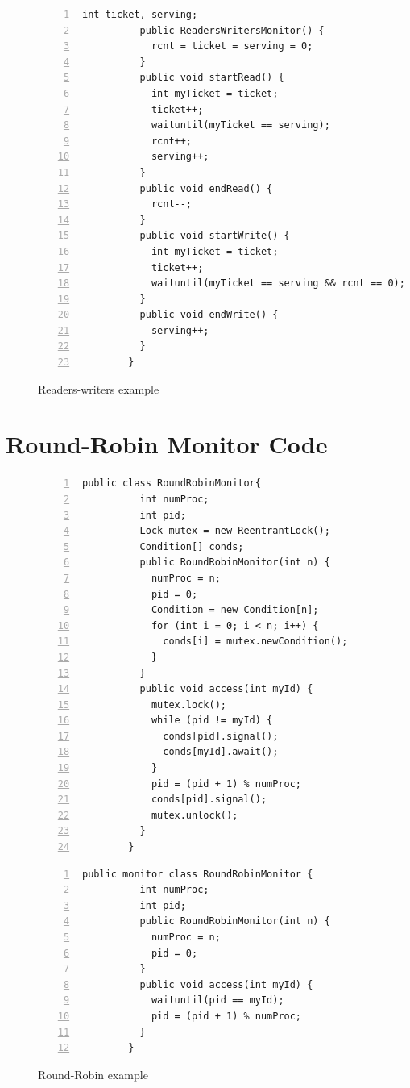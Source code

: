 \documentclass[preprint]{sigplanconf}
\begin{document}
\begin{figure}[ht!]
\begin{multicols}{2}
\begin{Verbatim}[fontsize=\footnotesize,gobble=8,frame=lines,framesep=5mm,
            numbers=left,numbersep=2pt,
            label=\fbox{\small\emph{Implicit-Signal Readers/Writers}}]
          int ticket, serving;
          public ReadersWritersMonitor() {
            rcnt = ticket = serving = 0;
          }
          public void startRead() {
            int myTicket = ticket;
            ticket++;
            waituntil(myTicket == serving);
            rcnt++;
            serving++;
          }
          public void endRead() {
            rcnt--;
          }
          public void startWrite() {
            int myTicket = ticket;
            ticket++; 
            waituntil(myTicket == serving && rcnt == 0);
          }
          public void endWrite() {
            serving++;
          }
        }
    \end{Verbatim}
\end{multicols}
  \caption{Readers-writers example}
  \label{fig:trw_exp}
\end{figure}
\section{Round-Robin Monitor Code}
\begin{figure}[ht!]
    \begin{Verbatim}[fontsize=\footnotesize,gobble=8,frame=topline,
            framesep=5mm,numbers=left,numbersep=2pt,
            label=\fbox{\small\emph{Explicit-Signal Bounded Buffer}}]
        public class RoundRobinMonitor{
          int numProc;
          int pid;
          Lock mutex = new ReentrantLock();
          Condition[] conds;
          public RoundRobinMonitor(int n) {
            numProc = n;
            pid = 0;
            Condition = new Condition[n];
            for (int i = 0; i < n; i++) {
              conds[i] = mutex.newCondition();
            }
          }
          public void access(int myId) {
            mutex.lock();
            while (pid != myId) {
              conds[pid].signal();
              conds[myId].await();
            }
            pid = (pid + 1) % numProc;
            conds[pid].signal();
            mutex.unlock();
          }
        }
    \end{Verbatim}
    \begin{Verbatim}[fontsize=\footnotesize,gobble=8,frame=lines,framesep=5mm,
            numbers=left,numbersep=2pt,
            label=\fbox{\small\emph{Implicit-Signal Bounded Buffer}}]
        public monitor class RoundRobinMonitor {
          int numProc;
          int pid;
          public RoundRobinMonitor(int n) {
            numProc = n;
            pid = 0;
          }
          public void access(int myId) {
            waituntil(pid == myId);
            pid = (pid + 1) % numProc;
          }
        }
    \end{Verbatim}
  \caption{Round-Robin example}
  \label{fig:rr_exp}
\end{figure}
\end{document}
